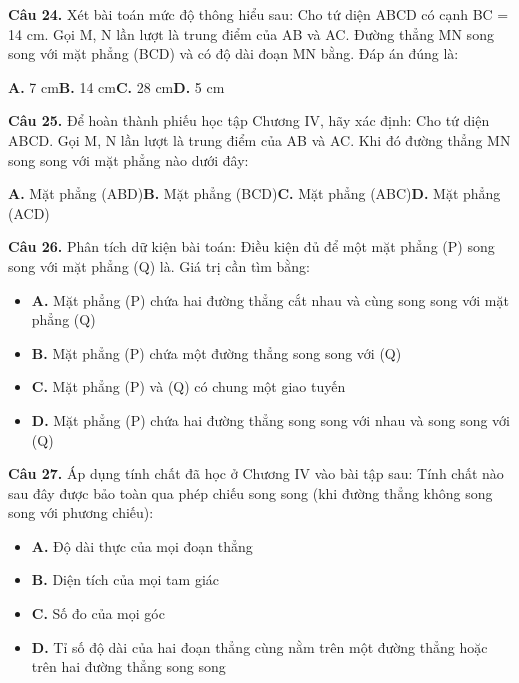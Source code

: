 \documentclass[11pt,a4paper]{article}
\begin{document}
\textbf{\color{primary} Câu 24.} Xét bài toán mức độ thông hiểu sau: Cho tứ diện ABCD có cạnh BC = 14 cm. Gọi M, N lần lượt là trung điểm của AB và AC. Đường thẳng MN song song với mặt phẳng (BCD) và có độ dài đoạn MN bằng. Đáp án đúng là:\par
\hspace*{1.5em}\textbf{A.} 7 cm\quad\quad \textbf{B.} 14 cm\quad\quad \textbf{C.} 28 cm\quad\quad \textbf{D.} 5 cm\par\vspace{2pt}
\textbf{\color{primary} Câu 25.} Để hoàn thành phiếu học tập Chương IV, hãy xác định: Cho tứ diện ABCD. Gọi M, N lần lượt là trung điểm của AB và AC. Khi đó đường thẳng MN song song với mặt phẳng nào dưới đây:\par
\hspace*{1.5em}\textbf{A.} Mặt phẳng (ABD)\quad\quad \textbf{B.} Mặt phẳng (BCD)\quad\quad \textbf{C.} Mặt phẳng (ABC)\quad\quad \textbf{D.} Mặt phẳng (ACD)\par\vspace{2pt}
\textbf{\color{primary} Câu 26.} Phân tích dữ kiện bài toán: Điều kiện đủ để một mặt phẳng (P) song song với mặt phẳng (Q) là. Giá trị cần tìm bằng:\par
\begin{itemize}\setlength{\itemsep}{1pt}\setlength{\parskip}{0pt}
  \item[] \textbf{A.} Mặt phẳng (P) chứa hai đường thẳng cắt nhau và cùng song song với mặt phẳng (Q)
  \item[] \textbf{B.} Mặt phẳng (P) chứa một đường thẳng song song với (Q)
  \item[] \textbf{C.} Mặt phẳng (P) và (Q) có chung một giao tuyến
  \item[] \textbf{D.} Mặt phẳng (P) chứa hai đường thẳng song song với nhau và song song với (Q)
\end{itemize}\vspace{2pt}
\textbf{\color{primary} Câu 27.} Áp dụng tính chất đã học ở Chương IV vào bài tập sau: Tính chất nào sau đây được bảo toàn qua phép chiếu song song (khi đường thẳng không song song với phương chiếu):\par
\begin{itemize}\setlength{\itemsep}{1pt}\setlength{\parskip}{0pt}
  \item[] \textbf{A.} Độ dài thực của mọi đoạn thẳng
  \item[] \textbf{B.} Diện tích của mọi tam giác
  \item[] \textbf{C.} Số đo của mọi góc
  \item[] \textbf{D.} Tỉ số độ dài của hai đoạn thẳng cùng nằm trên một đường thẳng hoặc trên hai đường thẳng song song
\end{itemize}\vspace{2pt}
\end{document}
